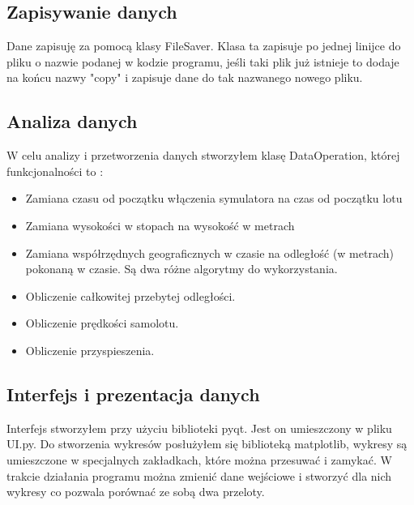 \documentclass[12pt,a4paper]{article}
\begin{document}
\subsection{Zapisywanie danych}
Dane zapisuję za pomocą klasy FileSaver. Klasa ta zapisuje po jednej linijce do pliku o nazwie podanej w kodzie programu, jeśli taki plik już istnieje to dodaje na końcu nazwy "copy" i zapisuje dane do tak nazwanego nowego pliku.
\subsection{Analiza danych}
W celu analizy i przetworzenia danych stworzyłem klasę DataOperation, której funkcjonalności to :
\begin{itemize}
\item Zamiana czasu od początku włączenia symulatora na czas od początku lotu
\item Zamiana wysokości w stopach na wysokość w metrach
\item Zamiana współrzędnych geograficznych w czasie na odległość (w metrach) pokonaną w czasie. Są dwa różne algorytmy do wykorzystania.
\item Obliczenie całkowitej przebytej odległości.
\item Obliczenie prędkości samolotu.
\item Obliczenie przyspieszenia.
\end{itemize}
\subsection{Interfejs i prezentacja danych}
Interfejs stworzyłem przy użyciu biblioteki pyqt. Jest on umieszczony w pliku UI.py. Do stworzenia wykresów posłużyłem się biblioteką matplotlib, wykresy są umieszczone w specjalnych zakładkach, które można przesuwać i zamykać. W trakcie działania programu można zmienić dane wejściowe i stworzyć dla nich wykresy co pozwala porównać ze sobą dwa przeloty.
\end{document}
